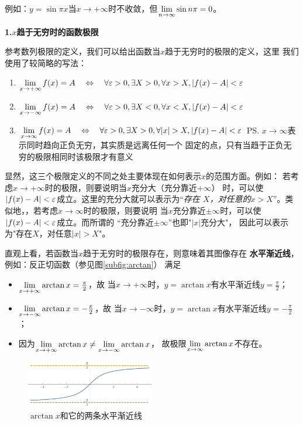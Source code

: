 例如：$y=\sin\pi x$当$x\to+\infty$时不收敛，但$\lim\limits_{n\to\infty}\sin n\pi=0$。
\fi

\bs
{\bf 1.\;$x$趋于无穷时的函数极限}

参考数列极限的定义，我们可以给出函数当$x$趋于无穷时的极限的定义，这里
我们使用了较简略的写法：
\begin{thx}
	\begin{enumerate}%
	  \item $\lim\limits_{x\to{+\infty}}f(x)=A\quad\Leftrightarrow\quad
	  \forall \varepsilon>0,\exists X>0,\forall x>X,|f(x)-A|<\varepsilon$
	  \item $\lim\limits_{x\to{-\infty}}f(x)=A\quad\Leftrightarrow\quad
	  \forall \varepsilon>0,\exists X<0,\forall x<X,|f(x)-A|<\varepsilon$
	  \item $\limx{\infty}f(x)=A\quad\Leftrightarrow\quad
	  \forall \e>0,\exists X>0,\forall |x|>X,|f(x)-A|<\e$
	  \ps{$x\to\infty$表示同时趋向正负无穷，其实质是远离任何一个
  	  固定的点，只有当趋于正负无穷的极限相同时该极限才有意义}
	\end{enumerate}
\end{thx}

显然，这三个极限定义的不同之处主要体现在如何表示$x$的范围方面。例如：
若考虑$x\to+\infty$时的极限，则要说明当$x$充分大（充分靠近$+\infty$）
时，可以使$|f(x)-A|<\varepsilon$成立。这里的充分大就可以表示为“{\it 存在
$X$，对任意的$x>X$}”。类似地，，若考虑$x\to\infty$时的极限，则要说明
当$x$充分靠近$\pm\infty$时，可以使$|f(x)-A|<\varepsilon$成立。而所谓的
“{\kaishu 充分靠近$\pm\infty$}”{\kaishu 也即"$|x|$充分大}"，
因此可以表示为"存在$X$，对任意$|x|>X$"。

\bs
直观上看，若函数当$x$趋于无穷时的极限存在，则意味着其图像存在
{\bf 水平渐近线}，例如：反正切函数（参见图\ref{subfig:arctan}）
满足
\begin{itemize}
	\item $\lim\limits_{x\to{+\infty}}\arctan x=\frac{\pi}{2}$，故
	当$x\to+\infty$时，$y=\arctan x$有水平渐近线$y=\frac{\pi}{2}$；
	\item $\lim\limits_{x\to{-\infty}}\arctan x=-\frac{\pi}{2}$，故
	当$x\to-\infty$时，$y=\arctan x$有水平渐近线$y=-\frac{\pi}{2}$；
	\item 因为$\lim\limits_{x\to{+\infty}}\arctan x\ne\lim\limits_{x\to{-\infty}}\arctan x$，
	故极限$\lim\limits_{x\to{\infty}}\arctan x$不存在。
\end{itemize}

\begin{figure}[h]
	\centering
	\includegraphics[width=0.5\textwidth]{./Images/Ch01/arcTanAsy.pdf}
	\caption{$\arctan x$和它的两条水平渐近线}
	\label{fig:arctanAsy}
\end{figure}
	
